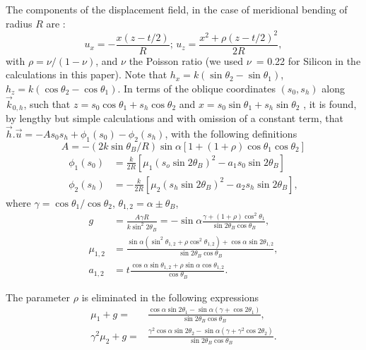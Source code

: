 \documentclass[preprint]{iucr}              %
\begin{document}
The components of the displacement field, in the case of meridional bending of radius $R$ are \cite{Nesterets}:
\begin{equation}
    u_x = -\frac{x(z-t/2)}{R}; \, u_z=\frac{x^2+\rho(z-t/2)^2}{2R},
\end{equation}
with $\rho=\nu/(1-\nu)$, and $\nu$ the Poisson ratio (we used $\nu$~= 0.22 for Silicon in the calculations in this paper). 
Note that $h_x=k(\sin\theta_2-\sin\theta_1)$, $h_z=k(\cos\theta_2-\cos\theta_1)$.
In terms of the oblique coordinates $(s_0,s_h)$ along $\vec k_{0,h}$, such that $z=s_0\cos\theta_1 + s_h \cos\theta_2$ and $x=s_0 \sin\theta_1+s_h\sin\theta_2$ , 
it is found, by lengthy but simple calculations and with omission of a constant term, that $\vec h.\vec u=-A s_0 s_h + \phi_1(s_0) -\phi_2(s_h)$,  
with the following definitions
\begin{equation}
    A = -(2 k \sin\theta_B /R)\sin\alpha[1+(1+\rho)\cos\theta_1\cos\theta_2]
\end{equation}
\begin{align}
    \phi_1(s_0) &= \frac{k}{2R}[\mu_1(s_o\sin2\theta_B)^2-a_1 s_0\sin2\theta_B] \nonumber \\
    \phi_2(s_h) &= -\frac{k}{2R}[\mu_2(s_h\sin2\theta_B)^2-a_2 s_h\sin2\theta_B],
\end{align}
where $\gamma=\cos\theta_1/\cos\theta_2$, $\theta_{1,2}=\alpha\pm \theta_B$,
\begin{align}
   g &= \frac{A \gamma R}{k \sin^2 2\theta_B} = -\sin\alpha\frac{\gamma +(1+\rho)\cos^2\theta_1}{\sin2\theta_B\cos\theta_B}, \nonumber \\
   \mu_{1,2} &=\frac{\sin\alpha(\sin^2\theta_{1,2}+\rho\cos^2\theta_{1,2})+\cos\alpha\sin2\theta_{1,2}}{\sin2\theta_B\cos\theta_B}, \nonumber \\
   a_{1,2} &=t\frac{\cos\alpha\sin\theta_{1,2}+\rho\sin\alpha\cos\theta_{1,2}}{\cos\theta_B}. \nonumber
\end{align}


The parameter $\rho$ is eliminated in the following expressions 
\begin{align}
    \mu_1+g=&\frac{\cos\alpha\sin2\theta_1-\sin\alpha(\gamma+\cos2\theta_1)}{\sin2\theta_B\cos\theta_B},
    \\
    \gamma^2\mu_2+g=&\frac{\gamma^2\cos\alpha\sin2\theta_2-\sin\alpha(\gamma+\gamma^2\cos2\theta_2)}{\sin2\theta_B\cos\theta_B}.
\end{align}
\end{document}
